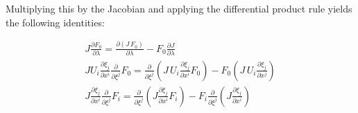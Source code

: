 Multiplying this by the Jacobian and applying the differential product rule yields the following identities:

\[\begin{array}{l}
J\frac{{\partial {F_0}}}{{\partial \lambda }} = \frac{{\partial \left( {J\,{F_0}} \right)}}{{\partial \lambda }} - {F_0}\frac{{\partial J}}{{\partial \lambda }}\\
J{U_i}\frac{{\partial {\xi _j}}}{{\partial {x^i}}}\frac{\partial }{{\partial {\xi ^j}}}{F_0} = \frac{\partial }{{\partial {\xi ^j}}}\left( {J\,{U_i}\frac{{\partial {\xi _j}}}{{\partial {x^i}}}{F_0}} \right) - {F_0}\left( {J\,{U_i}\frac{{\partial {\xi _j}}}{{\partial {x^j}}}} \right)\\
J\frac{{\partial {\xi _j}}}{{\partial {x^i}}}\frac{\partial }{{\partial {\xi ^j}}}{F_i} = \frac{\partial }{{\partial {\xi ^j}}}\left( {J\frac{{\partial {\xi _j}}}{{\partial {x^i}}}{F_i}} \right) - {F_i}\frac{\partial }{{\partial {\xi ^j}}}\left( {J\frac{{\partial {\xi _j}}}{{\partial {x^i}}}} \right)
\end{array}\]

